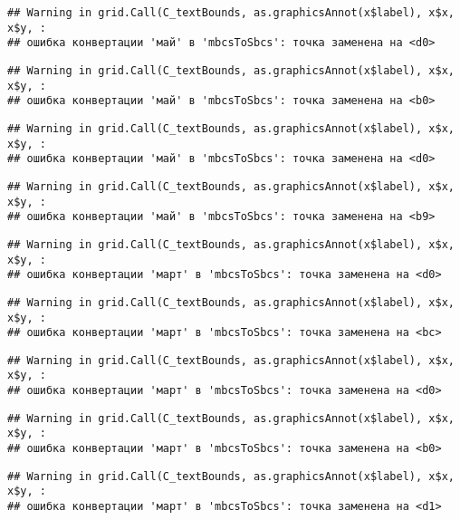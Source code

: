 \documentclass[
]{article}
\begin{document}
\begin{verbatim}
## Warning in grid.Call(C_textBounds, as.graphicsAnnot(x$label), x$x, x$y, :
## ошибка конвертации 'май' в 'mbcsToSbcs': точка заменена на <d0>
\end{verbatim}

\begin{verbatim}
## Warning in grid.Call(C_textBounds, as.graphicsAnnot(x$label), x$x, x$y, :
## ошибка конвертации 'май' в 'mbcsToSbcs': точка заменена на <b0>
\end{verbatim}

\begin{verbatim}
## Warning in grid.Call(C_textBounds, as.graphicsAnnot(x$label), x$x, x$y, :
## ошибка конвертации 'май' в 'mbcsToSbcs': точка заменена на <d0>
\end{verbatim}

\begin{verbatim}
## Warning in grid.Call(C_textBounds, as.graphicsAnnot(x$label), x$x, x$y, :
## ошибка конвертации 'май' в 'mbcsToSbcs': точка заменена на <b9>
\end{verbatim}

\begin{verbatim}
## Warning in grid.Call(C_textBounds, as.graphicsAnnot(x$label), x$x, x$y, :
## ошибка конвертации 'март' в 'mbcsToSbcs': точка заменена на <d0>
\end{verbatim}

\begin{verbatim}
## Warning in grid.Call(C_textBounds, as.graphicsAnnot(x$label), x$x, x$y, :
## ошибка конвертации 'март' в 'mbcsToSbcs': точка заменена на <bc>
\end{verbatim}

\begin{verbatim}
## Warning in grid.Call(C_textBounds, as.graphicsAnnot(x$label), x$x, x$y, :
## ошибка конвертации 'март' в 'mbcsToSbcs': точка заменена на <d0>
\end{verbatim}

\begin{verbatim}
## Warning in grid.Call(C_textBounds, as.graphicsAnnot(x$label), x$x, x$y, :
## ошибка конвертации 'март' в 'mbcsToSbcs': точка заменена на <b0>
\end{verbatim}

\begin{verbatim}
## Warning in grid.Call(C_textBounds, as.graphicsAnnot(x$label), x$x, x$y, :
## ошибка конвертации 'март' в 'mbcsToSbcs': точка заменена на <d1>
\end{verbatim}
\end{document}
